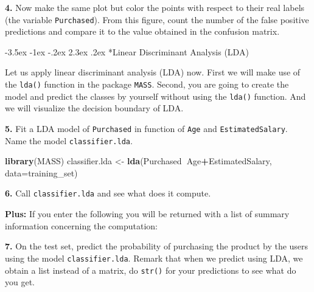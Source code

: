 \documentclass[]{book}
\makeatletter
\newenvironment{Shaded}{\begin{snugshade}}{\end{snugshade}}
\newcommand{\KeywordTok}[1]{\textcolor[rgb]{0.13,0.29,0.53}{\textbf{#1}}}
\newcommand{\DataTypeTok}[1]{\textcolor[rgb]{0.13,0.29,0.53}{#1}}
\newcommand{\StringTok}[1]{\textcolor[rgb]{0.31,0.60,0.02}{#1}}
\newcommand{\OperatorTok}[1]{\textcolor[rgb]{0.81,0.36,0.00}{\textbf{#1}}}
\newcommand{\NormalTok}[1]{#1}
\renewcommand\section{\@startsection {section}{1}{\z@}%
                                   {-3.5ex \@plus -1ex \@minus -.2ex}%
                                   {2.3ex \@plus.2ex}%
                                   {\normalfont\Large\bfseries\color{ForestGreen}}}
\theoremstyle{definition}
\theoremstyle{definition}
\theoremstyle{definition}
\theoremstyle{remark}
\makeatother
\begin{document}
\textbf{4.} Now make the same plot but color the points with respect to
their real labels (the variable \texttt{Purchased}). From this figure,
count the number of the false positive predictions and compare it to the
value obtained in the confusion matrix.

\section*{Linear Discriminant Analysis
(LDA)}\label{linear-discriminant-analysis-lda}

Let us apply linear discriminant analysis (LDA) now. First we will make
use of the \texttt{lda()} function in the package \texttt{MASS}. Second,
you are going to create the model and predict the classes by yourself
without using the \texttt{lda()} function. And we will visualize the
decision boundary of LDA.

\textbf{5.} Fit a LDA model of \texttt{Purchased} in function of
\texttt{Age} and \texttt{EstimatedSalary}. Name the model
\texttt{classifier.lda}.

\begin{Shaded}
\begin{Highlighting}[]
\KeywordTok{library}\NormalTok{(MASS)}
\NormalTok{classifier.lda <-}\StringTok{ }\KeywordTok{lda}\NormalTok{(Purchased}\OperatorTok{~}\NormalTok{Age}\OperatorTok{+}\NormalTok{EstimatedSalary, }\DataTypeTok{data=}\NormalTok{training_set)}
\end{Highlighting}
\end{Shaded}

\textbf{6.} Call \texttt{classifier.lda} and see what does it compute.

\textbf{Plus:} If you enter the following you will be returned with a
list of summary information concerning the computation:

\begin{Shaded}
\end{Shaded}

\textbf{7.} On the test set, predict the probability of purchasing the
product by the users using the model \texttt{classifier.lda}. Remark
that when we predict using LDA, we obtain a list instead of a matrix, do
\texttt{str()} for your predictions to see what do you get.
\end{document}
